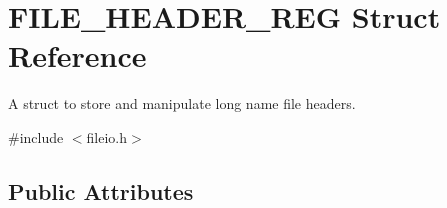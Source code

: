 \hypertarget{struct_f_i_l_e___h_e_a_d_e_r___r_e_g}{}\section{F\+I\+L\+E\+\_\+\+H\+E\+A\+D\+E\+R\+\_\+\+R\+E\+G Struct Reference}
\label{struct_f_i_l_e___h_e_a_d_e_r___r_e_g}


A struct to store and manipulate long name file headers.  




{\ttfamily \#include $<$fileio.\+h$>$}

\subsection*{Public Attributes}
